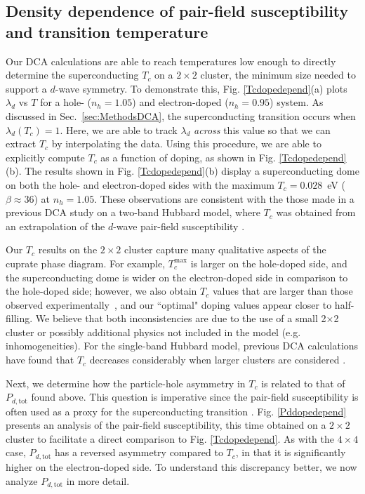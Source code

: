 \documentclass[reprint,nofootinbib,nobibnotes,amsmath,amssymb,aps,prb,floatfix]{revtex4-1}
\newcommand{\figdisp}[1]{Fig. \ref{#1}}
\begin{document}
\subsection{Density dependence of pair-field susceptibility and transition temperature}\label{Tc}
Our DCA calculations are able to reach temperatures low enough to directly determine the superconducting $T_c$ on a $2\times2$ cluster, the minimum size needed to support a $d$-wave symmetry. To demonstrate this, 
\figdisp{Tcdopedepend}(a) plots $\lambda_d$ vs $T$ for a hole- ($n_h=1.05$) and electron-doped ($n_h=0.95$) system. As discussed in Sec.~\ref{sec:MethodsDCA}, the superconducting transition occurs when $\lambda_d(T_c)=1$. Here, we are able to track $\lambda_d$ \textit{across} this value so that we can extract $T_c$ by  interpolating the data. 
Using this procedure, we are able to explicitly compute $T_c$ as a function of doping, as shown in \figdisp{Tcdopedepend}(b). The results shown in \figdisp{Tcdopedepend}(b) display a superconducting dome on both the hole- and electron-doped sides with the maximum $T_c=0.028$~eV ($\beta\approx 36$) at $n_h=1.05$. These observations are consistent with the those made in a previous DCA study on a two-band Hubbard model, where $T_c$ was obtained from an extrapolation of the $d$-wave pair-field susceptibility  \cite{Macridin}. 

Our $T_c$ results on the $2\times2$ cluster capture many qualitative aspects of the cuprate phase diagram. For example, $T_c^\mathrm{max}$ is larger on the hole-doped side, and the superconducting dome is wider on the electron-doped side in comparison to the hole-doped side; however, we also obtain $T_c$ values that are larger than those observed experimentally~\cite{Tallon}, and our ``optimal" doping values appear closer to half-filling. We believe that both inconsistencies are due to the use of a small 2$\times$2 cluster or possibly additional physics not included in the model (e.g.  inhomogeneities). For the single-band Hubbard model, previous DCA calculations have found that $T_c$ decreases considerably when larger clusters are considered \cite{Maier2}. 

Next, we determine how the particle-hole asymmetry in $T_c$ is related to that of $P_{d,\text{tot}}$ found above. This question is imperative since the pair-field susceptibility is often used as a proxy for the superconducting transition \cite{Maier2, Scalettar, Biborski,  Macridin}. \figdisp{Pddopedepend} presents an analysis of the pair-field susceptibility, this time obtained on a $2\times 2$ cluster to facilitate a direct comparison to \figdisp{Tcdopedepend}. 
As with the $4\times4$ case, $P_{d,\text{tot}}$ has a reversed asymmetry compared to $T_c$, in that it is significantly higher on the electron-doped side. 
To understand this discrepancy better, we now analyze $P_{d,\text{tot}}$ in more detail. 
\end{document}
